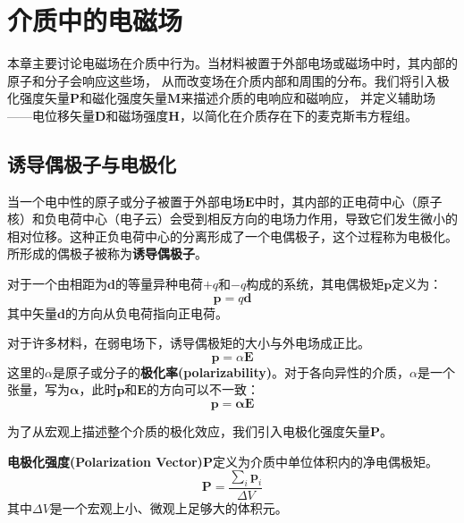 \documentclass[fontset=none]{ctexart}
\begin{document}
\section{介质中的电磁场}
本章主要讨论电磁场在介质中行为。当材料被置于外部电场或磁场中时，其内部的原子和分子会响应这些场，
从而改变场在介质内部和周围的分布。我们将引入极化强度矢量$\bm{P}$和磁化强度矢量$\bm{M}$来描述介质的电响应和磁响应，
并定义辅助场——电位移矢量$\bm{D}$和磁场强度$\bm{H}$，以简化在介质存在下的麦克斯韦方程组。

\subsection{诱导偶极子与电极化}
当一个电中性的原子或分子被置于外部电场$\bm{E}$中时，其内部的正电荷中心（原子核）和负电荷中心（电子云）会受到相反方向的电场力作用，导致它们发生微小的相对位移。这种正负电荷中心的分离形成了一个电偶极子，这个过程称为电极化。所形成的偶极子被称为\textbf{诱导偶极子}。

\begin{definition}[电偶极矩]
    对于一个由相距为$\bm{d}$的等量异种电荷$+q$和$-q$构成的系统，其电偶极矩$\bm{p}$定义为：
    \begin{equation}
        \bm{p} = q\bm{d}
    \end{equation}
    其中矢量$\bm{d}$的方向从负电荷指向正电荷。
\end{definition}

对于许多材料，在弱电场下，诱导偶极矩的大小与外电场成正比。
\begin{equation}
    \bm{p} = \alpha \bm{E}
\end{equation}
这里的$\alpha$是原子或分子的\textbf{极化率(polarizability)}。对于各向异性的介质，$\alpha$是一个张量，写为$\bm{\alpha}$，此时$\bm{p}$和$\bm{E}$的方向可以不一致：
\begin{equation}
    \bm{p} = \bm{\alpha} \bm{E}
\end{equation}

为了从宏观上描述整个介质的极化效应，我们引入电极化强度矢量$\bm{P}$。
\begin{definition}[电极化强度矢量]
    \textbf{电极化强度(Polarization Vector)}$\bm{P}$定义为介质中单位体积内的净电偶极矩。
    \begin{equation}
        \bm{P} = \frac{\sum_{i} \bm{p}_i}{\Delta V}
    \end{equation}
    其中$\Delta V$是一个宏观上小、微观上足够大的体积元。
\end{definition}
\end{document}
